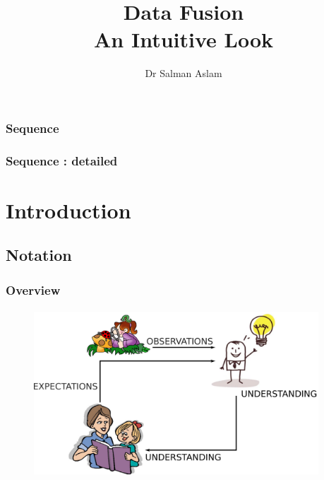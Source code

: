 

\title{Data Fusion\\
An Intuitive Look}  
\author{Dr Salman Aslam}
\date{} 




\begin{frame}[plain]\pw\Large
\vspace{0.8in}
\titlepage
\end{frame}

\begin{frame}[plain]\pw\Large
\frametitle{\textbf{Sequence}}
\setcounter{tocdepth}{1}
\tableofcontents
\end{frame} 

\begin{frame}[plain]\pw\Large
\frametitle{\textbf{Sequence : detailed}}
\setcounter{tocdepth}{2}
\tableofcontents%
\end{frame} 

\section{Introduction}
\begin{frame}\pw\Large
\frametitle{}
\framesubtitle{}
\end{frame}

\subsection{Notation}
\begin{frame}\pw\Large
\frametitle{Overview}
\framesubtitle{}
\begin{figure}
\includegraphics[width=0.95\textwidth]{figs/WFAR11_UCP_Update_Prediction_1_Notation-1.pdf}
\end{figure}
\end{frame}


